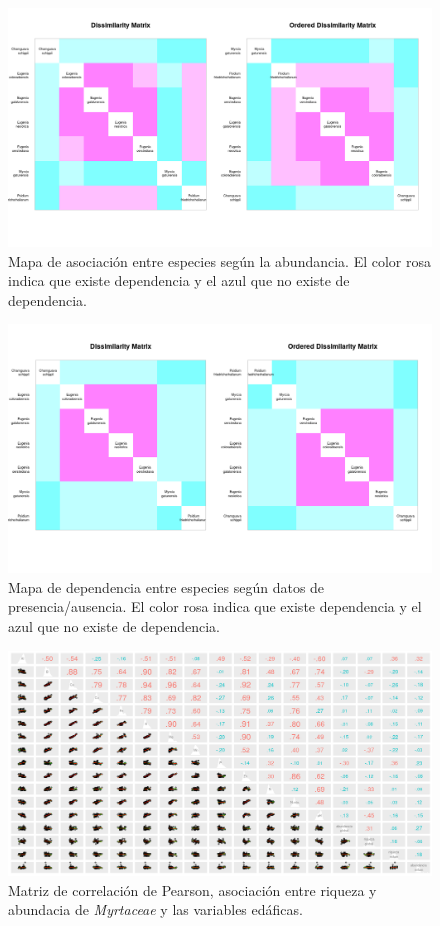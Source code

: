 \documentclass[11pt,]{article}
\begin{document}
\begin{figure}
\centering
\includegraphics[width=1.00000\textwidth]{dependencia_especies.png}
\caption{Mapa de asociación entre especies según la abundancia. El color
rosa indica que existe dependencia y el azul que no existe de
dependencia.\label{fig:asoespec}}
\end{figure}

\begin{figure}
\centering
\includegraphics[width=1.00000\textwidth]{depn_espc_jacc.png}
\caption{Mapa de dependencia entre especies según datos de
presencia/ausencia. El color rosa indica que existe dependencia y el
azul que no existe de dependencia.\label{fig:dependenciajacc}}
\end{figure}

\begin{figure}
\centering
\includegraphics[width=1.00000\textwidth]{Chi_var_edaf_asoc_R.png}
\caption{Matriz de correlación de Pearson, asociación entre riqueza y
abundacia de \emph{Myrtaceae} y las variables
edáficas.\label{fig:chivardep}}
\end{figure}
\end{document}
